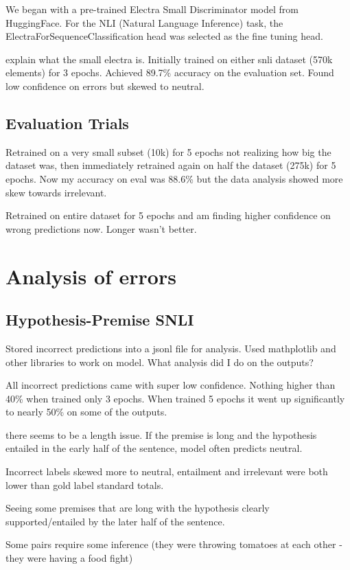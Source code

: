 \documentclass[11pt]{article}
\begin{document}
We began with a pre-trained Electra Small Discriminator model from HuggingFace. For the NLI (Natural Language Inference) task, the ElectraForSequenceClassification head was selected as the fine tuning head. 

explain what the small electra is.
Initially trained on either snli dataset (570k elements) for 3 epochs. Achieved 89.7\% accuracy on the evaluation set. Found low confidence on errors but skewed to neutral.
\subsection{Evaluation Trials}
Retrained on a very small subset (10k) for 5 epochs not realizing how big the dataset was, then immediately retrained again on half the dataset (275k) for 5 epochs. Now my accuracy on eval was 88.6\% but the data analysis showed more skew towards irrelevant.

Retrained on entire dataset for 5 epochs and am finding higher confidence on wrong predictions now. Longer wasn't better.

\section{Analysis of errors}
\subsection{Hypothesis-Premise SNLI}

Stored incorrect predictions into a jsonl file for analysis. Used mathplotlib and other libraries to work on model.
What analysis did I do on the outputs? 


All incorrect predictions came with super low confidence. Nothing higher than 40\% when trained only 3 epochs. When trained 5 epochs it went up significantly to nearly 50\% on some of the outputs.

there seems to be a length issue. If the premise is long and the hypothesis entailed in the early half of the sentence, model often predicts neutral.

Incorrect labels skewed more to neutral, entailment and irrelevant were both lower than gold label standard totals.

Seeing some premises that are long with the hypothesis clearly supported/entailed by the later half of the sentence. 

Some pairs require some inference (they were throwing tomatoes at each other - they were having a food fight)
\end{document}
